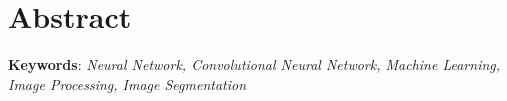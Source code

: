 \large
	\chapter*{Abstract}
\normalsize
\justifying

\textbf{Keywords}: 
\textit{Neural Network, Convolutional Neural Network, Machine Learning, Image Processing, Image Segmentation}\\

\break